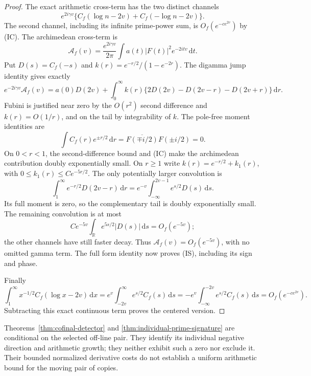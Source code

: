 \documentclass[11pt]{article}
\theoremstyle{remark}\newtheorem{remark}[theorem]{Remark}
\newcommand{\R}{\mathbb R}
\newcommand{\dd}{\,\mathrm d}
\begin{document}
\begin{proof}
The exact arithmetic cross-term has the two distinct channels
\[
 e^{2i\gamma v}
 \{C_f(\log n-2v)+C_f(-\log n-2v)\}.
\]
The second channel, including its infinite prime-power sum, is
$O_f(e^{-c e^{2v}})$ by (IC).
The archimedean cross-term is
\[
 \mathcal A_f(v)=\frac{e^{2i\gamma v}}{2\pi}
                      \int a(t)|F(t)|^2e^{-2itv}\dd t.
\]
Put $D(s)=C_f(-s)$ and $k(r)=e^{-r/2}/(1-e^{-2r})$.
The digamma jump identity gives exactly
\[
 e^{-2i\gamma v}\mathcal A_f(v)
 =a(0)D(2v)+\int_0^\infty k(r)
       \{2D(2v)-D(2v-r)-D(2v+r)\}\dd r.
\]
Fubini is justified near zero by the $O(r^2)$ second difference
and $k(r)=O(1/r)$, and on the tail by integrability of $k$.
The pole-free moment identities are
\[
 \int C_f(r)e^{\pm r/2}\dd r
           =\overline{F(\mp i/2)}F(\pm i/2)=0.
\]
On $0<r<1$, the second-difference bound and (IC) make the
archimedean contribution doubly exponentially small.
On $r\ge1$ write $k(r)=e^{-r/2}+k_1(r)$, with
$0\le k_1(r)\le C e^{-5r/2}$.
The only potentially larger convolution is
\[
 \int_1^\infty e^{-r/2}D(2v-r)\dd r
       =e^{-v}\int_{-\infty}^{2v-1}e^{s/2}D(s)\dd s.
\]
Its full moment is zero, so the complementary tail is doubly
exponentially small. The remaining convolution is at most
\[
 C e^{-5v}\int_\R e^{5s/2}|D(s)|\dd s=O_f(e^{-5v});
\]
the other channels have still faster decay.
Thus $\mathcal A_f(v)=O_f(e^{-5v})$, with no omitted gamma term.
The full form identity now proves (IS), including its sign and phase.

Finally
\[
 \int_1^\infty x^{-1/2}C_f(\log x-2v)\dd x
 =e^v\int_{-2v}^\infty e^{s/2}C_f(s)\dd s
 =-e^v\int_{-\infty}^{-2v}e^{s/2}C_f(s)\dd s
 =O_f(e^{-c e^{2v}}).
\]
Subtracting this exact continuous term proves the centered version.
\end{proof}

Theorems~\ref{thm:cofinal-detector} and
\ref{thm:individual-prime-signature} are conditional on the selected
off-line pair. They identify its individual negative direction and
arithmetic growth; they neither exhibit such a zero nor exclude it.
Their bounded normalized derivative costs do not establish a
uniform arithmetic bound for the moving pair of copies.
\end{document}
